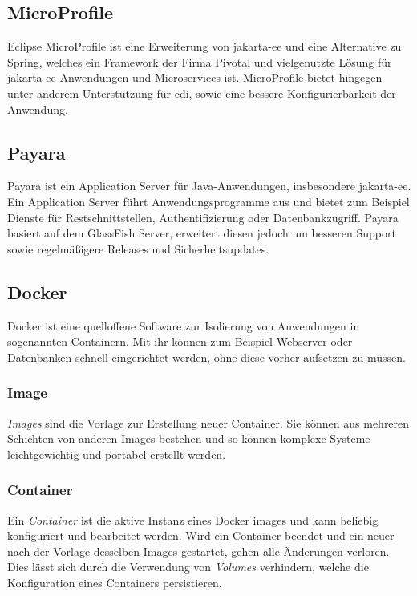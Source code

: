 \documentclass[12pt,twoside,a4paper]{article}
\begin{document}
\begin{sloppypar}
\subsection{MicroProfile}\label{sec:microprofile}
Eclipse MicroProfile ist eine Erweiterung von \acrshort{jakarta-ee} und eine Alternative zu Spring, welches ein Framework der Firma Pivotal und vielgenutzte Lösung für \acrshort{jakarta-ee} Anwendungen und Microservices ist.\newline
MicroProfile bietet hingegen unter anderem Unterstützung für \acrfull{cdi}, sowie eine bessere Konfigurierbarkeit der Anwendung.\newline\cite{microprofile}
\subsection{Payara}
Payara ist ein Application Server für Java-Anwendungen, insbesondere \acrshort{jakarta-ee}. Ein Application Server führt Anwendungsprogramme aus und bietet zum Beispiel Dienste für Restschnittstellen, Authentifizierung oder Datenbankzugriff. \cite{app-server}\newline
Payara basiert auf dem GlassFish Server, erweitert diesen jedoch um besseren Support sowie regelmäßigere Releases und Sicherheitsupdates.\newline\cite{payara-vs-glassfish}
\subsection{Docker}
Docker ist eine quelloffene Software zur Isolierung von Anwendungen in sogenannten Containern. Mit ihr können zum Beispiel Webserver oder Datenbanken schnell eingerichtet werden, ohne diese vorher aufsetzen zu müssen.
\subsubsection{Image}
\textit{Images} sind die Vorlage zur Erstellung neuer Container. Sie können aus mehreren Schichten von anderen Images bestehen und so können komplexe Systeme leichtgewichtig und portabel erstellt werden.
\subsubsection{Container}
Ein \textit{Container} ist die aktive Instanz eines Docker images und kann beliebig konfiguriert und bearbeitet werden. Wird ein Container beendet und ein neuer nach der Vorlage desselben Images gestartet, gehen alle Änderungen verloren. Dies lässt sich durch die Verwendung von \textit{Volumes} verhindern, welche die Konfiguration eines Containers persistieren.

\end{sloppypar}
\end{document}
